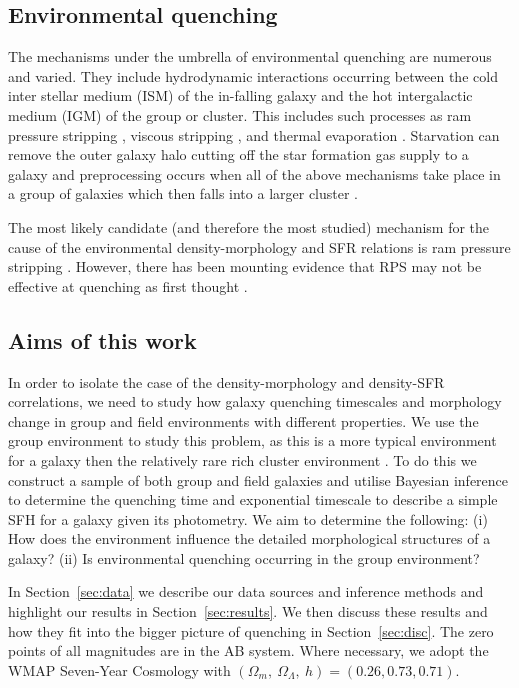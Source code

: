 \documentclass[useAMS,usenatbib]{mn2e}
\begin{document}
\subsection{Environmental quenching}
The mechanisms under the umbrella of environmental quenching are  numerous and varied.  They include hydrodynamic interactions occurring between the cold inter stellar medium (ISM) of the in-falling galaxy and the hot intergalactic medium (IGM) of the group or cluster. This includes such processes as ram pressure stripping \citep[]{gunngott72}, viscous stripping \citep[]{}, and thermal evaporation \citep[]{}. Starvation \citep{} can remove the outer galaxy halo cutting off the star formation gas supply to a galaxy and preprocessing occurs when all of the above mechanisms take place in a group of galaxies which then falls into a larger cluster \citep{}. 

The most likely candidate (and therefore the most studied) mechanism for the cause of the environmental density-morphology and SFR relations is ram pressure stripping \citep[RPS][]{}. However, there has been mounting evidence that RPS may not be effective at quenching as first thought \citep{emerick16, fillingham16}. 

\subsection{Aims of this work} 
In order to isolate the case of the density-morphology and density-SFR correlations, we need to study how galaxy quenching timescales and morphology change in group and field environments with different properties. We use the group environment to study this problem, as this is a more typical environment for a galaxy then the relatively rare rich cluster environment \citep{carlberg04}. To do this we construct a sample of both group and field galaxies and utilise Bayesian inference to determine the quenching time and exponential timescale to describe a simple SFH for a galaxy given its photometry. We aim to determine the following: (i) How does the environment influence the detailed morphological structures of a galaxy?  (ii) Is environmental quenching occurring in the group environment?

In Section~\ref{sec:data} we describe our data sources and inference methods and highlight our results in Section~\ref{sec:results}. We then discuss these results and how they fit into the bigger picture of quenching in Section~\ref{sec:disc}. The zero points of all magnitudes are in the AB system. Where necessary, we adopt the WMAP Seven-Year Cosmology \citep{jarosik11} with $(\Omega_m , ~\Omega_\Lambda , ~h) = (0.26, 0.73, 0.71)$.
\end{document}
